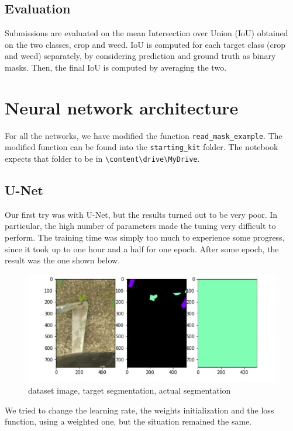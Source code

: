 \documentclass[12pt,a4paper]{report}
\begin{document}
	\section{Evaluation}
Submissions are evaluated on the mean Intersection over Union (IoU) obtained on the two classes, crop and weed. IoU is computed for each target class (crop and weed) separately, by considering prediction and ground truth as binary masks. Then, the final IoU is computed by averaging the two.


	\chapter{Neural network architecture}		
For all the networks, we have modified the function \texttt{read\_mask\_example}. The modified function can be found into the \texttt{starting\_kit} folder. The notebook expects that folder to be in \texttt{\textbackslash content\textbackslash drive\textbackslash MyDrive}.
		\section{U-Net}
Our first try was with U-Net, but the results turned out to be very poor. In particular, the high number of parameters made the tuning very difficult to perform. The training time was simply too much to experience some progress, since it took up to one hour and a half for one epoch. After some epoch, the result was the one shown below. 
\begin{figure}[H]
	\includegraphics[scale = .75, center]{U_Net}
	\caption{dataset image, target segmentation, actual segmentation}
\end{figure}
	
We tried to change the learning rate, the weights initialization and the loss function, using a weighted one, but the situation remained the same.	
		
\end{document}
